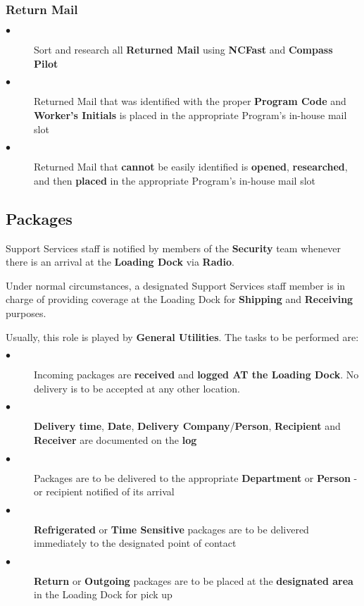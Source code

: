 \documentclass{article}
\begin{document}
\subsubsection{Return Mail}
\begin{description}
    \item[$\bullet$] Sort and research all \textbf{Returned Mail} using \textbf{NCFast} and \textbf{Compass Pilot}
    \item[$\bullet$] Returned Mail that was identified with the proper \textbf{Program Code} and \textbf{Worker's Initials} is placed in the appropriate Program's in-house mail slot
    \item[$\bullet$] Returned Mail that \textbf{cannot} be easily identified is \textbf{opened}, \textbf{researched}, and then \textbf{placed} in the appropriate Program's in-house mail slot
\end{description}

\subsection{Packages}
Support Services staff is notified by members of the \textbf{Security} team whenever there is an arrival at the \textbf{Loading Dock} via \textbf{Radio}. 
 
Under normal circumstances, a designated Support Services staff member is in charge of providing coverage at the Loading Dock for \textbf{Shipping} and \textbf{Receiving} purposes. 
 
Usually, this role is played by \textbf{General Utilities}. The tasks to be performed are:
\begin{description}
    \item[$\bullet$] Incoming packages are \textbf{received} and \textbf{logged AT the Loading Dock}. No delivery is to be accepted at any other location.
    \item[$\bullet$] \textbf{Delivery time}, \textbf{Date}, \textbf{Delivery Company}/\textbf{Person}, \textbf{Recipient} and \textbf{Receiver} are documented on the \textbf{log}
    \item[$\bullet$] Packages are to be delivered to the appropriate \textbf{Department} or \textbf{Person} - or recipient notified of its arrival
    \item[$\bullet$] \textbf{Refrigerated} or \textbf{Time Sensitive} packages are to be delivered immediately to the designated point of contact
    \item[$\bullet$] \textbf{Return} or \textbf{Outgoing} packages are to be placed at the \textbf{designated area} in the Loading Dock for pick up
\end{description}
\end{document}
